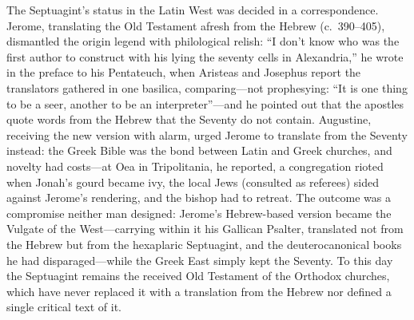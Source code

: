 The Septuagint's status in the Latin West was decided in a correspondence.
Jerome, translating the Old Testament afresh from the Hebrew
(c.~390--405), dismantled the origin legend with philological relish: ``I
don't know who was the first author to construct with his lying the
seventy cells in Alexandria,'' he wrote in the preface to his Pentateuch,
when Aristeas and Josephus report the translators gathered in one
basilica, comparing---not prophesying: ``It is one thing to be a seer,
another to be an interpreter''---and he pointed out that the apostles
quote words from the Hebrew that the Seventy do not
contain.
Augustine, receiving the new version with alarm, urged Jerome to
translate from the Seventy instead: the Greek Bible was the bond between
Latin and Greek churches, and novelty had costs---at Oea in
Tripolitania, he reported, a congregation rioted when Jonah's gourd
became ivy, the local Jews (consulted as referees) sided against
Jerome's rendering, and the bishop had to retreat. The outcome was a compromise neither man designed:
Jerome's Hebrew-based version became the Vulgate of the West---carrying
within it his Gallican Psalter, translated not from the Hebrew but from
the hexaplaric Septuagint, and the deuterocanonical books he had
disparaged---while the Greek East simply kept the Seventy. To this day
the Septuagint remains the received Old Testament of the Orthodox
churches, which have never replaced it with a translation from the
Hebrew nor defined a single critical text of it.
